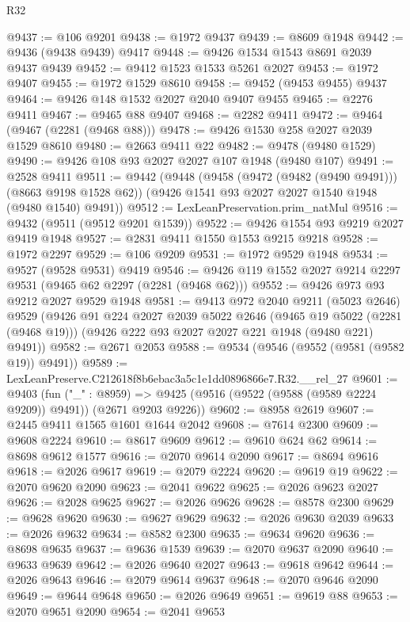 \begin{lexlean}{R32}
\begin{coremodule}
@9437 := @106 @9201
@9438 := @1972 @9437
@9439 := @8609 @1948
@9442 := @9436 (@9438 @9439) @9417
@9448 := @9426 @1534 @1543 @8691 @2039 @9437 @9439
@9452 := @9412 @1523 @1533 @5261 @2027
@9453 := @1972 @9407
@9455 := @1972 @1529 @8610
@9458 := @9452 (@9453 @9455) @9437
@9464 := @9426 @148 @1532 @2027 @2040 @9407 @9455
@9465 := @2276 @9411
@9467 := @9465 @88 @9407
@9468 := @2282 @9411
@9472 := @9464 (@9467 (@2281 (@9468 @88)))
@9478 := @9426 @1530 @258 @2027 @2039 @1529 @8610
@9480 := @2663 @9411 @22
@9482 := @9478 (@9480 @1529)
@9490 := @9426 @108 @93 @2027 @2027 @107 @1948 (@9480 @107)
@9491 := @2528 @9411
@9511 := @9442
    (@9448
      (@9458 (@9472 (@9482 (@9490 @9491))) (@8663 @9198 @1528 @62))
      (@9426 @1541 @93 @2027 @2027 @1540 @1948 (@9480 @1540) @9491))
@9512 := LexLeanPreservation.prim_natMul
@9516 := @9432 (@9511 (@9512 @9201 @1539))
@9522 := @9426 @1554 @93 @9219 @2027 @9419 @1948
@9527 := @2831 @9411 @1550 @1553 @9215 @9218
@9528 := @1972 @2297
@9529 := @106 @9209
@9531 := @1972 @9529 @1948
@9534 := @9527 (@9528 @9531) @9419
@9546 := @9426 @119 @1552 @2027 @9214 @2297 @9531 (@9465 @62 @2297 (@2281 (@9468 @62)))
@9552 := @9426 @973 @93 @9212 @2027 @9529 @1948
@9581 := @9413
    @972
    @2040
    @9211
    (@5023 @2646)
    @9529
    (@9426
      @91
      @224
      @2027
      @2039
      @5022
      @2646
      (@9465 @19 @5022 (@2281 (@9468 @19)))
      (@9426 @222 @93 @2027 @2027 @221 @1948 (@9480 @221) @9491))
@9582 := @2671 @2053
@9588 := @9534 (@9546 (@9552 (@9581 (@9582 @19)) @9491))
@9589 := LexLeanPreserve.C212618f8b6ebac3a5c1e1dd0896866e7.R32.__rel_27
@9601 := @9403
    (fun ("_" : @8959) =>
    @9425 (@9516 (@9522 (@9588 (@9589 @2224 @9209)) @9491)) (@2671 @9203 @9226))
@9602 := @8958 @2619
@9607 := @2445 @9411 @1565 @1601 @1644 @2042
@9608 := @7614 @2300
@9609 := @9608 @2224
@9610 := @8617 @9609
@9612 := @9610 @624 @62
@9614 := @8698 @9612 @1577
@9616 := @2070 @9614 @2090
@9617 := @8694 @9616
@9618 := @2026 @9617
@9619 := @2079 @2224
@9620 := @9619 @19
@9622 := @2070 @9620 @2090
@9623 := @2041 @9622
@9625 := @2026 @9623 @2027
@9626 := @2028 @9625
@9627 := @2026 @9626
@9628 := @8578 @2300
@9629 := @9628 @9620
@9630 := @9627 @9629
@9632 := @2026 @9630 @2039
@9633 := @2026 @9632
@9634 := @8582 @2300
@9635 := @9634 @9620
@9636 := @8698 @9635
@9637 := @9636 @1539
@9639 := @2070 @9637 @2090
@9640 := @9633 @9639
@9642 := @2026 @9640 @2027
@9643 := @9618 @9642
@9644 := @2026 @9643
@9646 := @2079 @9614 @9637
@9648 := @2070 @9646 @2090
@9649 := @9644 @9648
@9650 := @2026 @9649
@9651 := @9619 @88
@9653 := @2070 @9651 @2090
@9654 := @2041 @9653

\end{coremodule}
\end{lexlean}
